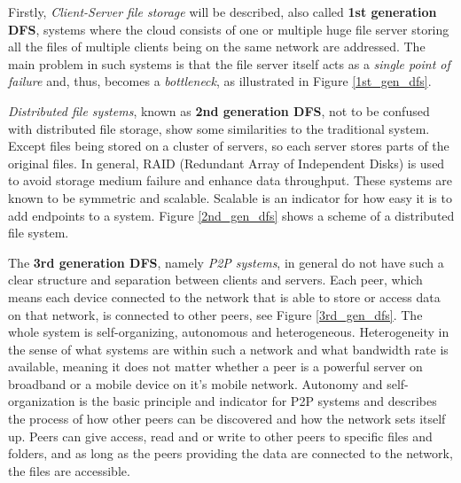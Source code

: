 Firstly, \textit{Client-Server file storage} will be described, also called \textbf{1st generation DFS}, systems where the cloud consists of one or multiple huge file server storing all the files of multiple clients being on the same network are addressed. The main problem in such systems is that the file server itself acts as a \textit{single point of failure} and, thus, becomes a \textit{bottleneck}, as illustrated in Figure \ref{1st_gen_dfs}.

\textit{Distributed file systems}, known as \textbf{2nd generation DFS}, not to be confused with distributed file storage, show some similarities to the traditional system. Except files being stored on a cluster of servers, so each server stores parts of the original files. In general, RAID (Redundant Array of Independent Disks) is used to avoid storage medium failure and enhance data throughput. These systems are known to be symmetric and scalable. Scalable is an indicator for how easy it is to add endpoints to a system. Figure \ref{2nd_gen_dfs} shows a scheme of a distributed file system.

The \textbf{3rd generation DFS}, namely \textit{P2P systems}, in general do not have such a clear structure and separation between clients and servers. Each peer, which means each device connected to the network that is able to store or access data on that network, is connected to other peers, see Figure \ref{3rd_gen_dfs}. The whole system is self-organizing, autonomous and heterogeneous. Heterogeneity in the sense of what systems are within such a network and what bandwidth rate is available, meaning it does not matter whether a peer is a powerful server on broadband or a mobile device on it's mobile network. Autonomy and self-organization is the basic principle and indicator for P2P systems and describes the process of how other peers can be discovered and how the network sets itself up. Peers can give access, read and or write to other peers to specific files and folders, and as long as the peers providing the data are connected to the network, the files are accessible.
	
